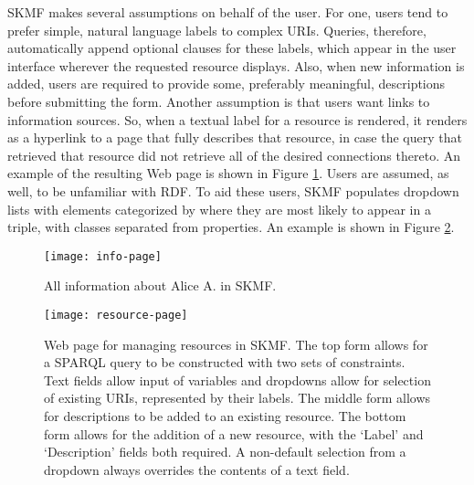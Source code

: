 SKMF makes several assumptions on behalf of the user. For one, users tend to prefer simple, natural language labels to complex URIs. Queries, therefore, automatically append optional clauses for these labels, which appear in the user interface wherever the requested resource displays. Also, when new information is added, users are required to provide some, preferably meaningful, descriptions before submitting the form. Another assumption is that users want links to information sources. So, when a textual label for a resource is rendered, it renders as a hyperlink to a page that fully describes that resource, in case the query that retrieved that resource did not retrieve all of the desired connections thereto. An example of the resulting Web page is shown in Figure
\ref{info-page}.
Users are assumed, as well, to be unfamiliar with RDF. To aid these users, SKMF populates dropdown lists with elements categorized by where they are most likely to appear in a triple, with classes separated from properties. An example is shown in Figure
\ref{resource-page}.

\begin{figure}[!ht]
\texttt{[image: info-page]}
\caption[Resource information page of SKMF]
 {\narrower All information about Alice A. in SKMF.
 }
\label{info-page}
\end{figure}

\begin{figure}[!ht]
\texttt{[image: resource-page]}
\caption[Resource management page of SKMF]
 {\narrower Web page for managing resources in SKMF. The top form allows for a SPARQL query to be constructed with two sets of constraints. Text fields allow input of variables and dropdowns allow for selection of existing URIs, represented by their labels. The middle form allows for descriptions to be added to an existing resource. The bottom form allows for the addition of a new resource, with the `Label' and `Description' fields both required. A non-default selection from a dropdown always overrides the contents of a text field.
 }
\label{resource-page}
\end{figure}


